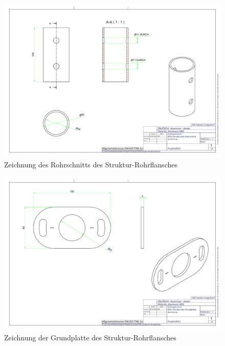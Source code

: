\begin{figure}[h!]
	\includegraphics[angle=90,width=\textwidth]{../ref/0012-Struktrurohr-Rohrschnitt.pdf}
	\caption{Zeichnung des Rohrschnitts des Struktur-Rohrflansches}
	\label{fig:Zeichnung-Strukturrohrflansch-Rohrschnitt}
\end{figure}

\begin{figure}[h!]
	\includegraphics[angle=90,width=\textwidth]{../ref/0011-Strukturrohr-Grundplatte.pdf}
	\caption{Zeichnung der Grundplatte des Struktur-Rohrflansches}
	\label{fig:Zeichnung-Strukturrohrflansch-Grundplatte}
\end{figure}

